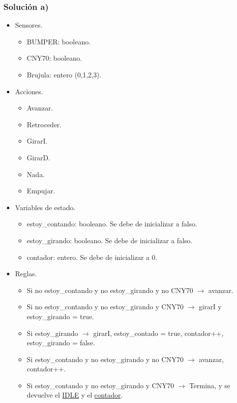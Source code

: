 \subsubsection*{Solución a)}

\begin{itemize}
    \item Sensores.
    \begin{itemize}
        \item BUMPER: booleano.
        \item CNY70: booleano.
        \item Brujula: entero (0,1,2,3).
    \end{itemize}
    \item Acciones.
    \begin{itemize}
        \item Avanzar.
        \item Retroceder.
        \item GirarI.
        \item GirarD.
        \item Nada.
        \item Empujar.
    \end{itemize}
    \item Variables de estado.
    \begin{itemize}
        \item estoy\_contando: booleano. Se debe de inicializar a falso.
        \item estoy\_girando: booleano. Se debe de inicializar a falso.
        \item contador: entero. Se debe de inicializar a 0.
    \end{itemize}
    \item Reglas.
    \begin{itemize}
        \item Si no estoy\_contando y no estoy\_girando y no CNY70 $\rightarrow$ avanzar.
        \item Si no estoy\_contando y no estoy\_girando y CNY70 $\rightarrow$ girarI y estoy\_girando = true.
        \item Si estoy\_girando $\rightarrow$ girarI, estoy\_contado = true, contador++, estoy\_girando = false.
        \item Si estoy\_contando y no estoy\_girando y no CNY70 $\rightarrow$ avanzar, contador++.
        \item Si estoy\_contando y no estoy\_girando y CNY70 $\rightarrow$ Termina, y se devuelve el \underline{IDLE} y el \underline{contador}.
        \end{itemize}
\end{itemize}

